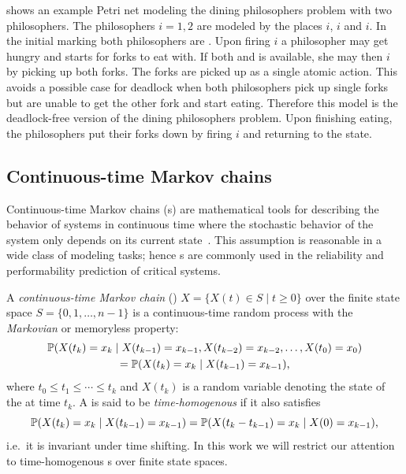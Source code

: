 \begin{runningExample}\label{ex:background:pn}
   shows an example Petri net modeling the dining philosophers problem with two philosophers. The philosophers \(i = 1, 2\) are modeled by the places \(i\), \(i\) and \(i\). In the initial marking both philosophers are . Upon firing \(i\) a philosopher may get hungry and starts  for forks to eat with. If both  and  is available, she may then \(i\) by picking up both forks. The forks are picked up as a single atomic action. This avoids a possible case for deadlock when both philosophers pick up single forks but are unable to get the other fork and start eating. Therefore this model is the deadlock-free version of the dining philosophers problem. Upon finishing eating, the philosophers put their forks down by firing \(i\) and returning to the  state.
\end{runningExample}

\subsection{Continuous-time Markov chains}
\label{ssec:background:ctmc}

Continuous-time Markov chains (s) are mathematical tools for describing the behavior of systems in continuous time where the stochastic behavior of the system only depends on its current state~. This assumption is reasonable in a wide class of modeling tasks; hence s are commonly used in the reliability and performability prediction of critical systems.

\begin{dfn}
  A \emph{continuous-time Markov chain} ()
  \(X = \{ X(t) \in S \mid t \ge 0 \}\) over the finite state
  space $S = \{0, 1, \ldots, n - 1\}$ is a continuous-time random
  process with the \emph{Markovian} or memoryless property:
  \begin{multline}\allowdisplaybreaks[0]
    \Pr(X(t_k) = x_k \mid X(t_{k - 1}) = x_{k - 1}, X(t_{k -
      2}) = x_{k - 2}, \ldots, X(t_{0}) = x_{0}) \\
    = \Pr(X(t_k) = x_k \mid X(t_{k - 1}) = x_{k - 1}) \text,
  \end{multline}
  where $t_0 \le t_1 \le \cdots \le t_k$ and $X(t_k)$ is a random variable denoting the state of the  at time $t_k$. A  is said to be
  \emph{time-homogenous} if it also satisfies
  \begin{equation}
    \Pr(X(t_k) = x_k \mid X(t_{k - 1}) = x_{k - 1}) = \Pr(X(t_k - t_{k -
      1}) = x_k \mid X(0) = x_{k - 1}) \text,
  \end{equation}
  i.e.~it is invariant under time shifting. In this work we will restrict our attention to time-homogenous s over finite state spaces.
\end{dfn}

